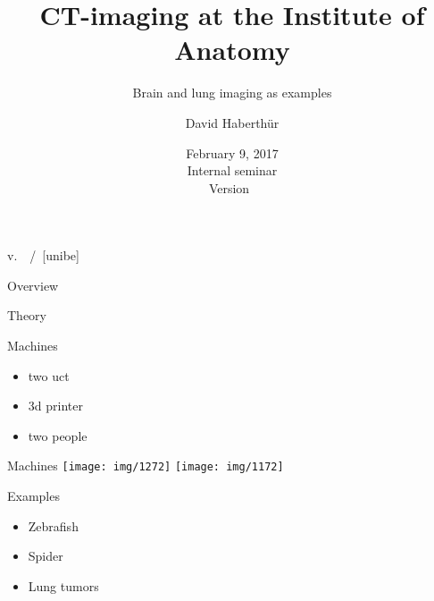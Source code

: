 \documentclass[18pt,caption=numbered]{beamer}
\subtitle{Brain and lung imaging as examples}
\author[DH]{David Haberthür}
\institute{Institute of Anatomy\\Universität Bern}
\date{February 9, 2017\\Internal seminar\\Version~\gitAbbrevHash}
\newcommand{\imsize}{\linewidth}
\begin{document}
\title[\si{\micro}CT imaging at ana.unibe.ch]{\si{\micro}CT-imaging at the Institute of Anatomy} %

{%
	\hspace*{\fill}%
	\insertauthor%
	\hspace*{\fill}%
	\insertshorttitle%
	\hspace*{\fill}%
	v.~\gitAbbrevHash%
	\hspace*{\fill}%
	\insertpagenumber\,/\,\insertpresentationendpage%
	\hspace*{\fill}%
	\vskip2pt%
}
[unibe]

{
\begin{frame}
  \titlepage
\end{frame}
}
\addtocounter{framenumber}{1}

\begin{frame}{Overview}
	\tableofcontents
\end{frame}

\begin{frame}{Theory}
\end{frame}

\begin{frame}{Machines}
	\begin{itemize}
		\item two uct
		\item 3d printer
		\item two people
	\end{itemize}
\end{frame}

\begin{frame}{Machines}	
	\renewcommand{\imsize}{0.618\linewidth}
	\centering	
	\vfill
	\texttt{[image: img/1272]}
	\vfill
	\texttt{[image: img/1172]}
\end{frame}

\begin{frame}{Examples}
	\begin{itemize}
		\item Zebrafish
		\item Spider
		\item Lung tumors
	\end{itemize}
\end{frame}
\end{document}
